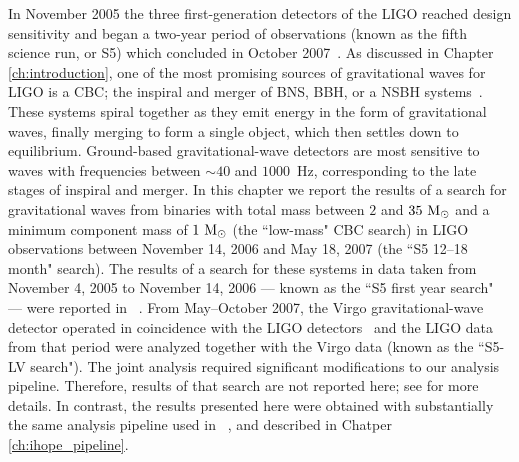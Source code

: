 \def\NSBHtripleCalErr{\ensuremath{24\%}}
\def\NSBHHoneLoneCalErr{\ensuremath{22\%}}
\def\NSBHHtwoLoneCalErr{\ensuremath{30\%}}

\def\NSBHtripleMonErr{\ensuremath{3\%}}
\def\NSBHHoneLoneMonErr{\ensuremath{7\%}}
\def\NSBHHtwoLoneMonErr{\ensuremath{10\%}}

\def\NSBHtripleWavErr{\ensuremath{32\%}}
\def\NSBHHoneLoneWavErr{\ensuremath{32\%}}
\def\NSBHHtwoLoneWavErr{\ensuremath{36\%}}

\def\NSBHtripleGDErr{\ensuremath{13\%}}
\def\NSBHHoneLoneGDErr{\ensuremath{13\%}}
\def\NSBHHtwoLoneGDErr{\ensuremath{18\%}}

\def\NSBHtripleGMErr{\ensuremath{18\%}}
\def\NSBHHoneLoneGMErr{\ensuremath{19\%}}
\def\NSBHHtwoLoneGMErr{\ensuremath{19\%}}


In November 2005 the three first-generation detectors of the \ac{LIGO} reached
design sensitivity and began a two-year period of observations (known as the
fifth science run, or S5) which concluded in October
2007~\cite{abbott:2007kva}.  As discussed in Chapter \ref{ch:introduction}, one
of the most promising sources of gravitational waves for LIGO is a \ac{CBC};
the inspiral and merger of \ac{BNS}, \ac{BBH}, or a \ac{NSBH}
systems~\cite{LIGOS1iul,LIGOS2iul,LIGOS2macho,
LIGOS2bbh,LIGOS3S4all,Collaboration:2009tt}. These systems spiral together as
they emit energy in the form of gravitational waves, finally merging to form a
single object, which then settles down to equilibrium. Ground-based
gravitational-wave detectors are most sensitive to waves with frequencies
between $\sim 40$ and $1000$~Hz, corresponding to the late stages of inspiral
and merger. In this chapter we report the results of a search for gravitational
waves from binaries with total mass between $2$ and $35~\mathrm{M_\odot}$ and a minimum
component mass of $1~\mathrm{M_\odot}$ (the ``low-mass" CBC search) in LIGO observations
between November 14, 2006 and May 18, 2007 (the ``S5 12--18 month" search). The
results of a search for these systems in data taken from November 4, 2005 to
November 14, 2006 --- known as the ``S5 first year search" --- were reported in
~\cite{Collaboration:2009tt}.  From May--October 2007, the Virgo
gravitational-wave detector operated in coincidence with the \ac{LIGO}
detectors~\cite{0264-9381-23-19-S01} and the \ac{LIGO} data from that period
were analyzed together with the Virgo data (known as the ``S5-LV search"). The
joint analysis required significant modifications to our analysis pipeline.
Therefore, results of that search are not reported here; see \cite{S5LowMassLV}
for more details. In contrast, the results presented here were obtained with
substantially the same analysis pipeline used in ~\cite{Collaboration:2009tt},
and described in Chatper \ref{ch:ihope_pipeline}.  

